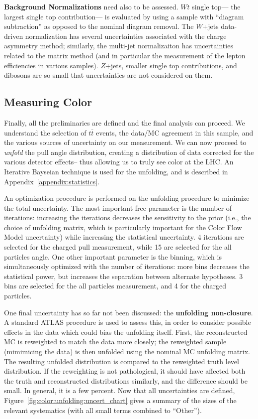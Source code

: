 	\textbf{Background Normalizations} need also to be assessed. $Wt$ single top--- the largest single top contribution--- is evaluated by using a sample with ``diagram subtraction'' as opposed to the nominal diagram removal. The $W$+jets data-driven normalization has several uncertainties associated with the charge asymmetry method; similarly, the multi-jet normalizaiton has uncertainties related to the matrix method (and in particular the measurement of the lepton efficiencies in various samples). $Z$+jets, smaller single top contributions, and dibosons are so small that uncertainties are not considered on them. 


\subsection{Measuring Color}

Finally, all the preliminaries are defined and the final analysis can proceed. We understand the selection of $t\bar{t}$ events, the data/MC agreement in this sample, and the various sources of uncertainty on our measurement. We can now proceed to \textit{unfold} the pull angle distribution, creating a distribution of data corrected for the various detector effects-- thus allowing us to truly see color at the LHC. An Iterative Bayseian technique is used for the unfolding, and is described in Appendix~\ref{appendix:statistics}.
	

An optimization procedure is performed on the unfolding procedure to minimize the total uncertainty. The most important free parameter is the number of iterations: increasing the iterations decreases the sensitivity to the prior (i.e., the choice of unfolding matrix, which is particularly important for the Color Flow Model uncertainty) while increasing the statistical uncertainty. 4 iterations are selected for the charged pull measurement, while 15 are selected for the all particles angle. One other important parameter is the binning, which is simultaneously optimized with the number of iterations: more bins decreases the statistical power, but increases the separation between alternate hypotheses. 3 bins are selected for the all particles measurement, and 4 for the charged particles.

One final uncertainty has so far not been discussed: the \textbf{unfolding non-closure}. A standard ATLAS procedure is used to assess this, in order to consider possible effects in the data which could bias the unfolding itself. First, the reconstructed MC is reweighted to match the data more closely; the reweighted sample (mimimicing the data) is then unfolded using the nominal MC unfolding matrix. The resulting unfolded distribution is compared to the reweighted truth level distribution. If the reweighting is not pathological, it should have affected both the truth and reconstructed distributions similarly, and the difference should be small. In general, it is a few percent. Now that all uncertainties are defined, Figure~\ref{fig:color:unfolding:uncert_chart} gives a summary of the sizes of the relevant systematics (with all small terms combined to ``Other'').



